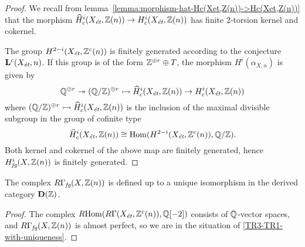 \documentclass{article}
\numberwithin{equation}{section}
\begin{document}
\begin{proposition}
\begin{proof}
    We recall from lemma~\ref{lemma:morphism-hat-Hc(Xet,Z(n))->Hc(Xet,Z(n))}
    that the morphism
    $\widehat{H}^i_c (X_\et, \ZZ (n)) \to H^i_c (X_\et, \ZZ (n))$ has finite
    $2$-torsion kernel and cokernel.

    The group $H^{2-i} (X_\et, \ZZ^c (n))$ is finitely generated
    according to the conjecture $\mathbf{L}^c (X_\et, n)$. If this
    group is of the form $\ZZ^{\oplus r}\oplus T$, the morphism
    $H^i (\alpha_{X,n})$ is given by
    \[ \QQ^{\oplus r} \twoheadrightarrow
      (\QQ/\ZZ)^{\oplus r} \rightarrowtail
      \widehat{H}^i_c (X_\et, \ZZ (n)) \to
      H^i_c (X_\et, \ZZ (n)) \]
    where
    $(\QQ/\ZZ)^{\oplus r} \rightarrowtail \widehat{H}^i_c (X_\et, \ZZ (n))$ is
    the inclusion of the maximal divisible subgroup in the group of cofinite
    type
    $$\widehat{H}^i_c (X_\et, \ZZ (n)) \cong \Hom (H^{2-i} (X_\et, \ZZ^c (n)), \QQ/\ZZ).$$
    Both kernel and cokernel of the above map are finitely generated, hence
    $H^i_\fg (X, \ZZ (n))$ is finitely generated.
  \end{proof}
\end{proposition}

\begin{proposition}
  \label{prop:RGamma-fg-uniquely-defined}
  The complex $R\Gamma_\fg (X, \ZZ (n))$ is defined up to a unique isomorphism
  in the derived category $\mathbf{D} (\ZZ)$.

  \begin{proof}
    The complex $\RHom (R\Gamma (X_\et, \ZZ^c (n)), \QQ [-2])$ consists of
    $\QQ$-vector spaces, and $R\Gamma_\fg (X, \ZZ (n))$ is almost perfect, so we
    are in the situation of \ref{TR3-TR1-with-uniqueness}.
  \end{proof}
\end{proposition}
\end{document}
